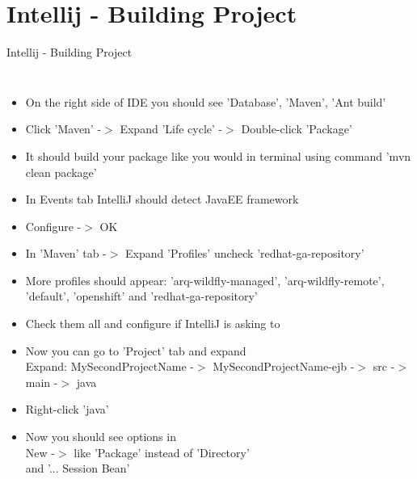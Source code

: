 \documentclass[aspectratio=1610,english]{beamer} %
\begin{document}
	\section{Intellij - Building Project}
	\begin{frame}{Intellij - Building Project}
		\begin{columns}
				\begin{itemize}
					\tiny
					\color{black}
					\item On the right side of IDE you should see 'Database', 'Maven', 'Ant build'
					\item Click 'Maven' -$>$ Expand 'Life cycle' -$>$ Double-click 'Package'
					\item It should build your package like you would in terminal using command 'mvn clean package'
					\item In Events tab IntelliJ should detect JavaEE framework
					\item Configure -$>$ OK
					\item In 'Maven' tab -$>$ Expand 'Profiles' uncheck 'redhat-ga-repository' 
					\item More profiles should appear: 'arq-wildfly-managed', 'arq-wildfly-remote', 'default', 'openshift' and 'redhat-ga-repository'
					\item Check them all and configure if IntelliJ is asking to
					\item Now you can go to 'Project' tab and expand \\
						Expand: MySecondProjectName -$>$ MySecondProjectName-ejb -$>$ src -$>$ main -$>$ java 
					\item Right-click 'java'
					\item Now you should see options in \\ 
						New -$>$ like 'Package' instead of 'Directory' \\ 
						and '... Session Bean'
				\end{itemize}
				

\end{columns}
\end{frame}
\end{document}
